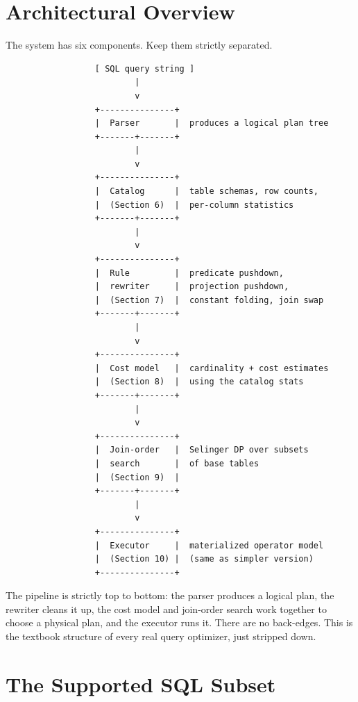 \documentclass[11pt,a4paper]{article}
\begin{document}
\section{Architectural Overview}

The system has six components. Keep them strictly separated.

\begin{codebox}
\begin{lstlisting}
                  [ SQL query string ]
                          |
                          v
                  +---------------+
                  |  Parser       |  produces a logical plan tree
                  +-------+-------+
                          |
                          v
                  +---------------+
                  |  Catalog      |  table schemas, row counts,
                  |  (Section 6)  |  per-column statistics
                  +-------+-------+
                          |
                          v
                  +---------------+
                  |  Rule         |  predicate pushdown,
                  |  rewriter     |  projection pushdown,
                  |  (Section 7)  |  constant folding, join swap
                  +-------+-------+
                          |
                          v
                  +---------------+
                  |  Cost model   |  cardinality + cost estimates
                  |  (Section 8)  |  using the catalog stats
                  +-------+-------+
                          |
                          v
                  +---------------+
                  |  Join-order   |  Selinger DP over subsets
                  |  search       |  of base tables
                  |  (Section 9)  |
                  +-------+-------+
                          |
                          v
                  +---------------+
                  |  Executor     |  materialized operator model
                  |  (Section 10) |  (same as simpler version)
                  +---------------+
\end{lstlisting}
\end{codebox}

The pipeline is strictly top to bottom: the parser produces a logical plan, the rewriter cleans it up, the cost model and join-order search work together to choose a physical plan, and the executor runs it. There are no back-edges. This is the textbook structure of every real query optimizer, just stripped down.

\section{The Supported SQL Subset}
\end{document}
